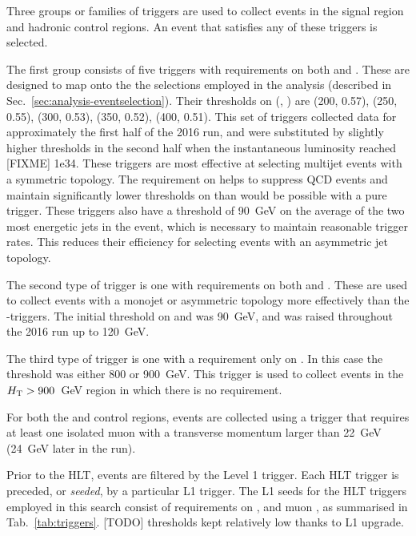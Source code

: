 Three groups or families of triggers are used to collect events in the signal 
region and hadronic control regions. An event that satisfies any of these 
triggers is selected.

The first group consists of five triggers with requirements on both \scalht and 
\alphat. These are designed to map onto the the selections employed in the 
analysis (described in Sec.~\ref{sec:analysis-eventselection}). Their 
thresholds on (\scalht, \alphat) are (200, 0.57), (250, 0.55), (300, 0.53), 
(350, 0.52), (400, 0.51). This set of triggers collected data for approximately 
the first half of the 2016 run, and were substituted by slightly higher \alphat 
thresholds in the second half when the instantaneous luminosity reached [FIXME] 
1e34.
These triggers are most effective at selecting multijet events with a symmetric 
topology. The requirement on \alphat helps to suppress QCD events and maintain 
significantly lower thresholds on \scalht than would be possible with a pure 
\scalht trigger.
These triggers also have a threshold of 90~GeV on the average \pt of the two 
most energetic jets in the event, which is necessary to maintain reasonable 
trigger rates. This reduces their efficiency for selecting events with an 
asymmetric jet topology.

The second type of trigger is one with requirements on both \met and \mht. 
These are used to collect events with a monojet or asymmetric topology more 
effectively than the \scalht-\alphat triggers. The initial threshold on \met 
and \mht was 90~GeV, and was raised throughout the 2016 run up to 120~GeV.

The third type of trigger is one with a requirement only on \scalht. In this 
case the threshold was either 800 or 900~GeV. This trigger is used to collect 
events in the $\mbox{$H_\text{T}$}>900$~GeV region in which there is no \alphat requirement.

For both the \mj and \mmj control regions, events are collected using a trigger 
that requires at least one isolated muon with a transverse momentum larger than 
22~GeV (24~GeV later in the run).

Prior to the HLT, events are filtered by the Level 1 trigger. Each HLT trigger 
is preceded, or \textit{seeded}, by a particular L1 trigger. The L1 seeds for 
the HLT triggers employed in this search consist of requirements on \scalht, 
\met and muon \pt, as summarised in Tab.~\ref{tab:triggers}. [TODO] thresholds 
kept relatively low thanks to L1 upgrade.

